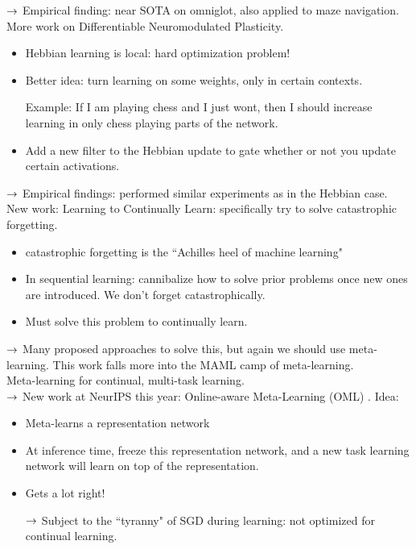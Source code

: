 $\rightarrow$ Empirical finding: near SOTA on omniglot, also applied to maze navigation. \\

More work on Differentiable Neuromodulated Plasticity.
\begin{itemize}
    \item Hebbian learning is local: hard optimization problem!
    \item Better idea: turn learning on some weights, only in certain contexts.
    
    Example: If I am playing chess and I just wont, then I should increase learning in only chess playing parts of the network.
    
    \item Add a new filter to the Hebbian update to gate whether or not you update certain activations.
\end{itemize}

$\rightarrow$ Empirical findings: performed similar experiments as in the Hebbian case. \\

New work: Learning to Continually Learn: specifically try to solve catastrophic forgetting.
\begin{itemize}
    \item catastrophic forgetting is the ``Achilles heel of machine learning"
    \item In sequential learning: cannibalize how to solve prior problems once new ones are introduced. We don't forget catastrophically.
    \item Must solve this problem to continually learn.
\end{itemize}

$\rightarrow$ Many proposed approaches to solve this, but again we should use meta-learning. This work falls more into the MAML camp of meta-learning. \\

Meta-learning for continual, multi-task learning. \\

$\rightarrow$ New work at NeurIPS this year: Online-aware Meta-Learning (OML) \cite{javed2019meta}. Idea:
\begin{itemize}
    \item Meta-learns a representation network
    \item At inference time, freeze this representation network, and a new task learning network will learn on top of the representation.
    \item Gets a lot right!
    
    $\rightarrow$ Subject to the ``tyranny" of SGD during learning: not optimized for continual learning.
\end{itemize}

